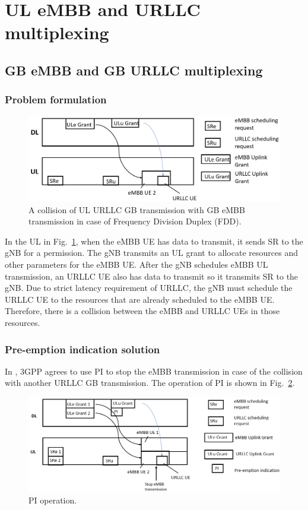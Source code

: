 \documentclass{ieeeaccess}
\begin{document}
\section{UL eMBB and URLLC multiplexing}\label{II}
\subsection{GB eMBB and GB URLLC multiplexing} \label{IIA}
\subsubsection{Problem formulation}\label{IIA1}

\begin{figure}[htbp]
\centerline{\includegraphics[scale=0.33]{fig7.PNG}}
\caption{A collision of UL URLLC GB transmission with GB eMBB transmission in case of Frequency Division Duplex (FDD).}
\label{fig7}
\end{figure}

In the UL in Fig.~\ref{fig7}, when the eMBB UE has data to transmit, it sends SR to the gNB for a permission. The gNB transmits an UL grant to allocate resources and other parameters for the eMBB UE. After the gNB schedules eMBB UL transmission, an URLLC UE also has data to transmit so it transmits SR to the gNB. Due to strict latency requirement of URLLC, the gNB must schedule the URLLC UE to the resources that are already scheduled to the eMBB UE. Therefore, there is a collision between the eMBB and URLLC UEs in those resources.

\subsubsection{Pre-emption indication solution}

In \cite{ref20}, 3GPP agrees to use PI to stop the eMBB transmission in case of the collision with another URLLC GB transmission. The operation of PI is shown in Fig.~\ref{fig8}.

\begin{figure}[htbp]
\centerline{\includegraphics[scale=0.33]{fig8.PNG}}
\caption{PI operation.}
\label{fig8}
\end{figure}
\end{document}
